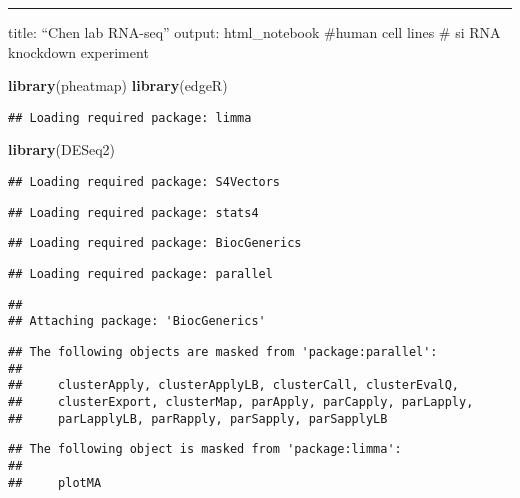 \documentclass[]{article}
\title{}
\author{}
\date{}
\newenvironment{Shaded}{\begin{snugshade}}{\end{snugshade}}
\newcommand{\KeywordTok}[1]{\textcolor[rgb]{0.13,0.29,0.53}{\textbf{#1}}}
\newcommand{\NormalTok}[1]{#1}
\begin{document}
\begin{center}\rule{0.5\linewidth}{\linethickness}\end{center}

title: ``Chen lab RNA-seq'' output: html\_notebook \#human cell lines \#
si RNA knockdown experiment

\begin{Shaded}
\begin{Highlighting}[]
\KeywordTok{library}\NormalTok{(pheatmap)}
\KeywordTok{library}\NormalTok{(edgeR)}
\end{Highlighting}
\end{Shaded}

\begin{verbatim}
## Loading required package: limma
\end{verbatim}

\begin{Shaded}
\begin{Highlighting}[]
\KeywordTok{library}\NormalTok{(DESeq2)}
\end{Highlighting}
\end{Shaded}

\begin{verbatim}
## Loading required package: S4Vectors
\end{verbatim}

\begin{verbatim}
## Loading required package: stats4
\end{verbatim}

\begin{verbatim}
## Loading required package: BiocGenerics
\end{verbatim}

\begin{verbatim}
## Loading required package: parallel
\end{verbatim}

\begin{verbatim}
## 
## Attaching package: 'BiocGenerics'
\end{verbatim}

\begin{verbatim}
## The following objects are masked from 'package:parallel':
## 
##     clusterApply, clusterApplyLB, clusterCall, clusterEvalQ,
##     clusterExport, clusterMap, parApply, parCapply, parLapply,
##     parLapplyLB, parRapply, parSapply, parSapplyLB
\end{verbatim}

\begin{verbatim}
## The following object is masked from 'package:limma':
## 
##     plotMA
\end{verbatim}
\end{document}
